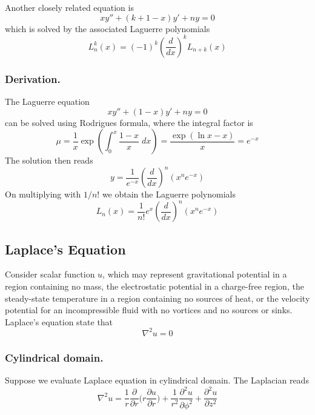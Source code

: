 \documentclass[../../../main.tex]{subfiles}
\begin{document}
Another closely related equation is 
\begin{equation*}
    xy''+(k+1-x)y'+ny=0
\end{equation*}
which is solved by the associated Laguerre polynomials
\begin{equation*}
    L_n^k(x)=(-1)^k\left(\frac{d}{dx}\right)^kL_{n+k}(x)
\end{equation*}

\subsubsection{Derivation.} 
The Laguerre equation
\begin{equation*}
    xy''+(1-x)y'+ny=0
\end{equation*}
can be solved using Rodrigues formula, where the integral factor is 
\begin{equation*}
    \mu=\frac{1}{x}\exp\left(\int_{0}^{x}\frac{1-x}{x}\;dx\right)=\frac{\exp(\ln x-x )}{x}=e^{-x}
\end{equation*}
The solution then reads
\begin{equation*}
    y=\frac{1}{e^{-x}}\left(\frac{d}{dx}\right)^n\left(x^ne^{-x}\right)
\end{equation*}
On multiplying with $1/n!$ we obtain the Laguerre polynomials
\begin{equation*}
    L_n(x)=\frac{1}{n!}e^x\left(\frac{d}{dx}\right)^n(x^ne^{-x})
\end{equation*}

\subsection{Laplace's Equation}
Consider scalar function $u$, which may represent gravitational potential in a region containing no mass, the electrostatic potential in a charge-free region, the steady-state temperature in a region containing no sources of heat, or the velocity potential for an incompressible fluid with no vortices and no sources or sinks.
Laplace's equation state that
\begin{equation*}
    \nabla^2 u=0
\end{equation*}

\subsubsection{Cylindrical domain.} Suppose we evaluate Laplace equation in cylindrical domain. 
The Laplacian reads
\begin{equation*}
    \nabla^2u= \frac{1}{r}\frac{\partial}{\partial r}\Biggl(r\frac{\partial u}{\partial r}\Biggr)+\frac{1}{r^2} \frac{\partial^2u}{\partial \phi^2}+ \frac{\partial^2u}{\partial z^2}
\end{equation*}
\end{document}

